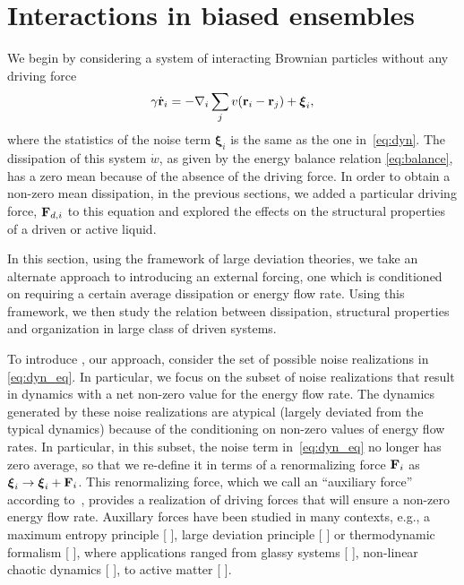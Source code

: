 \documentclass[superscriptaddress, twocolumn, prx, longbibliography, nofootinbib]{revtex4-1}
\newcommand{\tn}[1]{{\color{blue}#1}}
\begin{document}


\section{Interactions in biased ensembles}\label{sec:bias}

\tn{We begin by considering a system of interacting Brownian particles without any driving force} 
\begin{equation}\label{eq:dyn_eq}
	\gamma\dot{\bf r}_i = - \nabla_i \sum_j v({\bf r}_i-{\bf r}_j) + {\boldsymbol\xi}_i ,
\end{equation}
where the statistics of the noise term ${\boldsymbol\xi}_i$ is the same as the one in~\eqref{eq:dyn}. 
\tn{The dissipation of this system $\dot{w}$, as given by the energy balance relation \eqref{eq:balance}, has a zero mean because of the absence of the driving force. 
In order to obtain a non-zero mean dissipation, in the previous sections, we added a particular driving force,  
${\bf F}_{d,i}$ to this equation and explored the effects on the structural properties of a driven or active liquid.} %

\tn{In this section, using the framework of large deviation theories, we take an alternate approach to introducing an external forcing, one which is conditioned on requiring a certain average dissipation or energy flow rate. Using this framework, we then study the relation between dissipation, structural properties and organization in large class of driven systems.}



\tn{To introduce , our approach, consider the set of possible noise realizations in \eqref{eq:dyn_eq}. In particular, we focus on the subset of noise realizations that result in dynamics with a net non-zero value for the energy flow rate. The dynamics generated by these noise realizations are atypical (largely deviated from the typical dynamics) because of the conditioning on non-zero values of energy flow rates. In particular, in this subset, the noise term in~\eqref{eq:dyn_eq} no longer has zero average, so that we re-define it in terms of a renormalizing force ${\bf F}_i$ as ${\boldsymbol \xi}_i \to {\boldsymbol \xi}_i + {\bf F}_i$. 
This renormalizing force, which we call an ``auxiliary force'' according to~\cite{Jack2010,Chetrite2013}, provides a realization of driving forces that will ensure a non-zero energy flow rate. Auxillary forces have been studied in many contexts, e.g., a maximum entropy principle [ ], large deviation principle [ ] or thermodynamic formalism [ ], where applications ranged from glassy systems [ ], non-linear chaotic dynamics [ ], to active matter [ ].}
\end{document}
